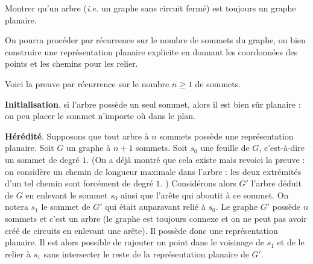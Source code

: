 \begin{exo}
Montrer qu'un arbre (\emph{i.e.} un graphe sans circuit fermé) est toujours un graphe planaire.
\begin{center}
\end{center}
\begin{hint}
On pourra procéder par récurrence sur le nombre de sommets du graphe, ou bien construire une représentation planaire explicite en donnant les coordonnées des points et les chemins pour les relier.
\end{hint}
\begin{sol}
Voici la preuve par récurrence sur le nombre $n\geq 1$ de sommets.

\textbf{Initialisation}. si l'arbre possède un seul sommet, alors il est bien sûr planaire : on peu placer le sommet n'importe où dans le plan.

\textbf{Hérédité}. Supposons que tout arbre à  $n$ sommets possède une représentation planaire. Soit $G$ un graphe à $n+1$ sommets. Soit $s_0$ une \og feuille\fg{} de $G$, c'est-à-dire un sommet de degré $1$. (On a déjà montré que cela existe mais revoici la preuve : on considère un chemin de longueur maximale dans l'arbre : les deux extrémités d'un tel chemin sont forcément de degré $1$. ) Considérons alors $G'$ l'arbre déduit de $G$ en enlevant le sommet $s_0$ ainsi que l'arête qui aboutit à ce sommet. On notera $s_1$ le sommet de $G'$ qui était auparavant relié à $s_0$. Le graphe $G'$ possède $n$ sommets et c'est un arbre (le graphe est toujours connexe et on ne peut pas avoir créé de circuits en enlevant une arête). Il possède donc une représentation planaire. Il est alors possible de rajouter un point dans le voisinage de $s_1$ et de le relier à $s_1$ sans intersecter le reste de la représentation planaire de $G'$.
\end{sol}
\end{exo}

